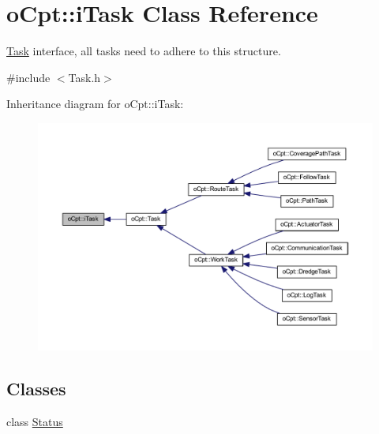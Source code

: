 \hypertarget{classo_cpt_1_1i_task}{}\section{o\+Cpt\+:\+:i\+Task Class Reference}
\label{classo_cpt_1_1i_task}


\hyperlink{classo_cpt_1_1_task}{Task} interface, all tasks need to adhere to this structure.  




{\ttfamily \#include $<$Task.\+h$>$}



Inheritance diagram for o\+Cpt\+:\+:i\+Task\+:\nopagebreak
\begin{figure}[H]
\begin{center}
\leavevmode
\includegraphics[width=350pt]{classo_cpt_1_1i_task__inherit__graph}
\end{center}
\end{figure}
\subsection*{Classes}
\begin{DoxyCompactItemize}
\item 
class \hyperlink{classo_cpt_1_1i_task_1_1_status}{Status}
\end{DoxyCompactItemize}
